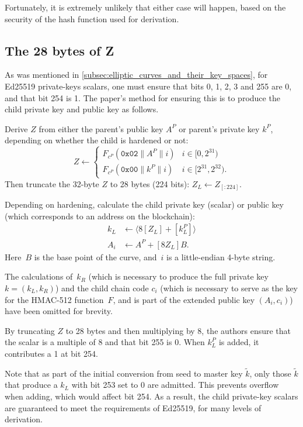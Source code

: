 \documentclass[12pt, a4paper, twocolumn]{article}
\begin{document}
Fortunately, it is extremely unlikely that either case will happen, based on the security of the hash function used for derivation.

\subsection{The 28 bytes of Z}
\label{subsec:the_28_bytes_of_z}

As was mentioned in \cref{subsec:elliptic_curves_and_their_key_spaces}, for Ed25519 private-keys scalars, one must ensure that bits 0, 1, 2, 3 and 255 are 0, and that bit 254 is 1.
The paper's method for ensuring this is to produce the child private key and public key as follows.

Derive $Z$ from either the parent's public key $A^{P}$ or parent's private key $k^{P}$, depending on whether the child is hardened or not:
\[ Z \leftarrow
  \begin{cases} 
    F_{c^P}(\mathtt{0x02} \| A^P \| i) & i \in  [0, 2^{31}) \\
    F_{c^P}(\mathtt{0x00} \| k^P \| i) & i \in [2^{31}, 2^{32}) .
  \end{cases} \]
Then truncate the 32-byte $Z$ to 28 bytes (224 bits): $Z_L \leftarrow Z_{[:224]}$.

Depending on hardening, calculate the child private key (scalar) or public key (which corresponds to an address on the blockchain):
\begin{align*}
  k_L &\leftarrow \langle 8[Z_L]  + [k_L^P]\rangle \\
  A_i &\leftarrow A^P + [8Z_L]B .
\end{align*}
Here~$B$ is the base point of the curve, and~$i$ is a little-endian 4-byte string.

The calculations of~$k_R$ (which is necessary to produce the full private key $k = (k_L, k_R)$) and the child chain code $c_i$ (which is necessary to serve as the key for the HMAC-512 function~$F$, and is part of the extended public key $(A_i, c_i)$) have been omitted for brevity.

By truncating $Z$ to 28 bytes and then multiplying by 8, the authors ensure that the scalar is a multiple of 8 and that bit 255 is 0.
When $k_L^P$ is added, it contributes a 1 at bit 254.

Note that as part of the initial conversion from seed to master key $\tilde{k}$, only those $\tilde{k}$ that produce a $k_L$ with bit 253 set to 0 are admitted.
This prevents overflow when adding, which would affect bit 254.
As a result, the child private-key scalars are guaranteed to meet the requirements of Ed25519, for many levels of derivation.
\end{document}
